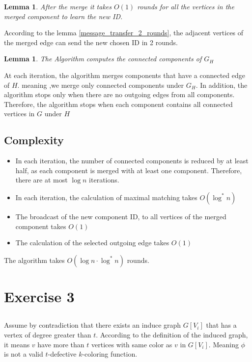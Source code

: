 \documentclass[11pt]{article}
\newtheorem{lemma}[theorem]{Lemma}
\begin{document}
\begin{lemma}
After the merge it takes $O(1)$ rounds for all the vertices in the merged component to learn the new ID.
\end{lemma}
According to the lemma \ref{message_transfer_2_rounds}, the adjacent vertices of the merged edge can send the new chosen ID in 2 rounds.

\begin{lemma}
The Algorithm computes the connected components of $G_H$
\end{lemma}
At each iteration, the algorithm merges components that have a connected edge of $H$. meaning ,we merge only connected components under $G_H$. In addition, the algorithm stops only when there are no outgoing edges from all components. Therefore, the algorithm stops when each component contains all connected vertices in $G$ under $H$

\subsection*{Complexity}
\begin{itemize}
    \item In each iteration, the number of connected components is reduced by at least half, as each component is merged with at least one component. Therefore, there are at most $\log{n}$ iterations.
    \item In each iteration, the calculation of maximal matching takes $O(\log^{*}{n})$
    \item The broadcast of the new component ID, to all vertices of the merged component takes $O(1)$
    \item The calculation of the selected outgoing edge takes $O(1)$
\end{itemize}
The algorithm takes $O(\log{n} \cdot \log^{*}{n})$ rounds.

\section{Exercise 3}

\subsection{}
Assume by contradiction that there exists an induce graph $G[V_i]$ that has a vertex of degree greater than $t$. According to the definition of the induced graph, it means $v$ have more than $t$ vertices with same color as $v$ in $G[V_i]$. Meaning $\phi$ is not a valid $t$-defective $k$-coloring function.
\end{document}
